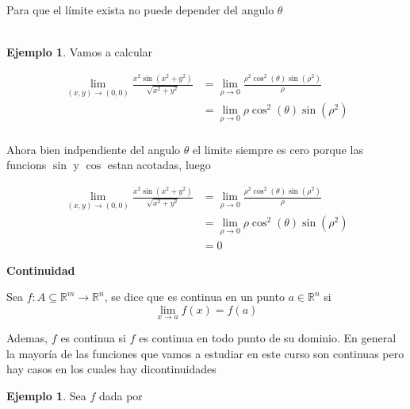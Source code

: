 \documentclass{article}
\theoremstyle{plain}
\theoremstyle{definition}
\newtheorem{ejem}[thm]{Ejemplo}
\begin{document}
Para que el límite exista no puede depender del angulo $\theta$ \\ \\




\begin{ejem}Vamos a calcular \\
\end{ejem}


\begin{align*}
\displaystyle \lim_{(x,y) \to (0,0)}   \frac{x^2\sin(x^2+y^2)}{\sqrt{x^2+y^2}}  &=  \lim_{\rho \to 0}  \frac{\rho^2 \cos^2(\theta)\sin(\rho^2)}{\rho} \\
&=  \lim_{\rho \to 0}  \rho \cos^2(\theta)\sin(\rho^2) \\
\end{align*}

Ahora bien indpendiente del angulo $\theta$ el limite siempre es cero porque las funcions $\sin$ y $\cos$ estan acotadas, luego



\begin{align*}
\displaystyle \lim_{(x,y) \to (0,0)}   \frac{x^2\sin(x^2+y^2)}{\sqrt{x^2+y^2}}  &=  \lim_{\rho \to 0}  \frac{\rho^2 \cos^2(\theta)\sin(\rho^2)}{\rho} \\
&=  \lim_{\rho \to 0}  \rho \cos^2(\theta)\sin(\rho^2) \\
&= 0
\end{align*}


\newpage

\begin{center}
\textbf{\large{Continuidad}} \\
\end{center}

Sea $f : A \subseteq \mathbb{R}^m \to \mathbb{R}^n$, se dice que es continua en un punto $a \in \mathbb{R}^n$ si   \\


\begin{equation}
\lim_{x \to a} f(x) = f(a)
\end{equation}


Ademas, $f$ es continua si $f$ es continua en todo punto de su dominio. En general la mayor\'ia de las funciones que vamos a estudiar en este curso son continuas pero hay casos en los cuales hay dicontinuidades\ \\

\begin{ejem}Sea $f$ dada por
\end{ejem}
\end{document}
